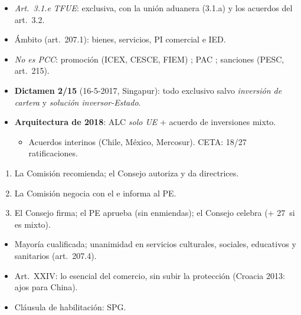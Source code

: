 \documentclass{article}
\begin{document}
\begin{columnas}
\begin{itemize}
\item \emph{Art.~3.1.e TFUE}: exclusiva, con la unión aduanera (3.1.a) y los acuerdos del art.~3.2.
\item Ámbito (art.~207.1): bienes, servicios, PI comercial e IED.
\item \emph{No es PCC}: promoción (ICEX, CESCE, FIEM) ; PAC ; sanciones (PESC, art.~215).
\end{itemize}

\begin{itemize}
\item \textbf{Dictamen 2/15} (16-5-2017, Singapur): todo exclusivo salvo \emph{inversión de cartera} y \emph{solución inversor-Estado}.
\item \textbf{Arquitectura de 2018}: ALC \emph{solo UE} + acuerdo de inversiones mixto.
  \begin{itemize}
  \item Acuerdos interinos (Chile, México, Mercosur). CETA: 18/27 ratificaciones.
  \end{itemize}
\end{itemize}
\begin{enumerate}
\item La Comisión recomienda; el Consejo autoriza y da directrices.
\item La Comisión negocia con el  e informa al PE.
\item El Consejo firma; el PE aprueba (sin enmiendas); el Consejo celebra (+ 27~si es mixto).
\end{enumerate}
\begin{itemize}
\item Mayoría cualificada; unanimidad en servicios culturales, sociales, educativos y sanitarios (art.~207.4).
\end{itemize}
\begin{itemize}
\item Art.~XXIV: lo esencial del comercio, sin subir la protección (Croacia 2013: ajos para China).
\item Cláusula de habilitación: SPG.
\end{itemize}


\end{columnas}
\end{document}
